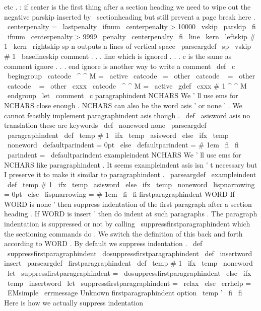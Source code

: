 {{etc
.
:
if
%
center
is
the
first
thing
after
a
section
heading
we
need
to
wipe
%
out
the
negative
parskip
inserted
by
\
sectionheading
but
still
%
prevent
a
page
break
here
.
\
centerpenalty
=
\
lastpenalty
\
ifnum
\
centerpenalty
>
10000
\
vskip
\
parskip
\
fi
\
ifnum
\
centerpenalty
>
9999
\
penalty
\
centerpenalty
\
fi
\
line
{
\
kern
\
leftskip
#
1
\
kern
\
rightskip
}
%
}
%
sp
n
outputs
n
lines
of
vertical
space
%
\
parseargdef
\
sp
{
\
vskip
#
1
\
baselineskip
}
%
comment
.
.
.
line
which
is
ignored
.
.
.
%
c
is
the
same
as
comment
%
ignore
.
.
.
end
ignore
is
another
way
to
write
a
comment
\
def
\
c
{
\
begingroup
\
catcode
\
^
^
M
=
\
active
%
\
catcode
\
=
\
other
\
catcode
\
{
=
\
other
\
catcode
\
}
=
\
other
%
\
cxxx
}
{
\
catcode
\
^
^
M
=
\
active
\
gdef
\
cxxx
#
1
^
^
M
{
\
endgroup
}
}
%
\
let
\
comment
\
c
%
paragraphindent
NCHARS
%
We
'
ll
use
ems
for
NCHARS
close
enough
.
%
NCHARS
can
also
be
the
word
asis
'
or
none
'
.
%
We
cannot
feasibly
implement
paragraphindent
asis
though
.
%
\
def
\
asisword
{
asis
}
%
no
translation
these
are
keywords
\
def
\
noneword
{
none
}
%
\
parseargdef
\
paragraphindent
{
%
\
def
\
temp
{
#
1
}
%
\
ifx
\
temp
\
asisword
\
else
\
ifx
\
temp
\
noneword
\
defaultparindent
=
0pt
\
else
\
defaultparindent
=
#
1em
\
fi
\
fi
\
parindent
=
\
defaultparindent
}
%
exampleindent
NCHARS
%
We
'
ll
use
ems
for
NCHARS
like
paragraphindent
.
%
It
seems
exampleindent
asis
isn
'
t
necessary
but
%
I
preserve
it
to
make
it
similar
to
paragraphindent
.
\
parseargdef
\
exampleindent
{
%
\
def
\
temp
{
#
1
}
%
\
ifx
\
temp
\
asisword
\
else
\
ifx
\
temp
\
noneword
\
lispnarrowing
=
0pt
\
else
\
lispnarrowing
=
#
1em
\
fi
\
fi
}
%
firstparagraphindent
WORD
%
If
WORD
is
none
'
then
suppress
indentation
of
the
first
paragraph
%
after
a
section
heading
.
If
WORD
is
insert
'
then
do
indent
at
such
%
paragraphs
.
%
%
The
paragraph
indentation
is
suppressed
or
not
by
calling
%
\
suppressfirstparagraphindent
which
the
sectioning
commands
do
.
%
We
switch
the
definition
of
this
back
and
forth
according
to
WORD
.
%
By
default
we
suppress
indentation
.
%
\
def
\
suppressfirstparagraphindent
{
\
dosuppressfirstparagraphindent
}
\
def
\
insertword
{
insert
}
%
\
parseargdef
\
firstparagraphindent
{
%
\
def
\
temp
{
#
1
}
%
\
ifx
\
temp
\
noneword
\
let
\
suppressfirstparagraphindent
=
\
dosuppressfirstparagraphindent
\
else
\
ifx
\
temp
\
insertword
\
let
\
suppressfirstparagraphindent
=
\
relax
\
else
\
errhelp
=
\
EMsimple
\
errmessage
{
Unknown
firstparagraphindent
option
\
temp
'
}
%
\
fi
\
fi
}
%
Here
is
how
we
actually
suppress
indentation
}
